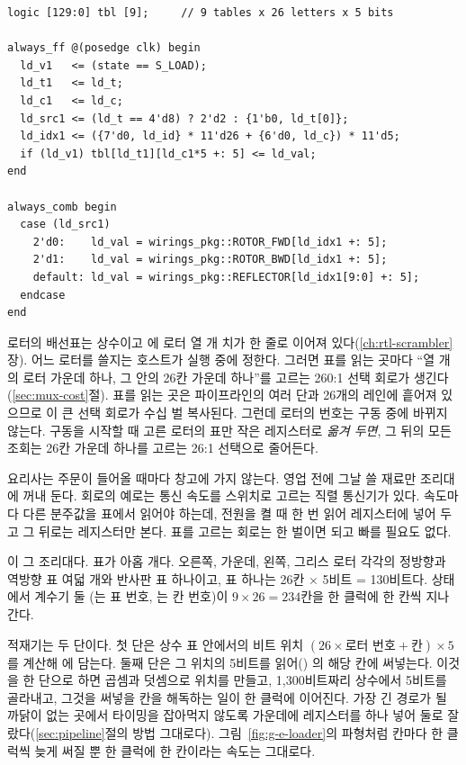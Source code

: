 \begin{lstlisting}[language=SV,caption={\code{bombe\_engine.sv}: 배선표를 한 칸씩 옮기는 두 단짜리 적재기.},label={lst:e-loader}]
logic [129:0] tbl [9];     // 9 tables x 26 letters x 5 bits

always_ff @(posedge clk) begin
  ld_v1   <= (state == S_LOAD);
  ld_t1   <= ld_t;
  ld_c1   <= ld_c;
  ld_src1 <= (ld_t == 4'd8) ? 2'd2 : {1'b0, ld_t[0]};
  ld_idx1 <= ({7'd0, ld_id} * 11'd26 + {6'd0, ld_c}) * 11'd5;
  if (ld_v1) tbl[ld_t1][ld_c1*5 +: 5] <= ld_val;
end

always_comb begin
  case (ld_src1)
    2'd0:    ld_val = wirings_pkg::ROTOR_FWD[ld_idx1 +: 5];
    2'd1:    ld_val = wirings_pkg::ROTOR_BWD[ld_idx1 +: 5];
    default: ld_val = wirings_pkg::REFLECTOR[ld_idx1[9:0] +: 5];
  endcase
end
\end{lstlisting}

\Why 로터의 배선표는 상수이고 에 로터 열 개 치가 한 줄로 이어져 있다(\ref{ch:rtl-scrambler}장).
어느 로터를 쓸지는 호스트가 실행 중에 정한다. 그러면 표를 읽는 곳마다 ``열 개의 로터 가운데 하나, 그
안의 26칸 가운데 하나''를 고르는 260:1 선택 회로가 생긴다(\ref{sec:mux-cost}절). 표를 읽는 곳은
파이프라인의 여러 단과 26개의 레인에 흩어져 있으므로 이 큰 선택 회로가 수십 벌 복사된다. 그런데 로터의
번호는 구동 중에 바뀌지 않는다. 구동을 시작할 때 고른 로터의 표만 작은 레지스터로 \emph{옮겨 두면},
그 뒤의 모든 조회는 26칸 가운데 하나를 고르는 26:1 선택으로 줄어든다.

\General 요리사는 주문이 들어올 때마다 창고에 가지 않는다. 영업 전에 그날 쓸 재료만 조리대에 꺼내 둔다.
회로의 예로는 통신 속도를 스위치로 고르는 직렬 통신기가 있다. 속도마다 다른 분주값을 표에서 읽어야 하는데,
전원을 켤 때 한 번 읽어 레지스터에 넣어 두고 그 뒤로는 레지스터만 본다. 표를 고르는 회로는 한 벌이면 되고
빠를 필요도 없다.

\Ours {}이 그 조리대다. 표가 아홉 개다. 오른쪽, 가운데, 왼쪽, 그리스 로터 각각의 정방향과 역방향
표 여덟 개와 반사판 표 하나이고, 표 하나는 26칸 $\times$ 5비트 = 130비트다.  상태에서 계수기 둘
(는 표 번호, 는 칸 번호)이 $9 \times 26 = 234$칸을 한 클럭에 한 칸씩 지나간다.

적재기는 두 단이다. 첫 단은 상수 표 안에서의 비트 위치 $(26 \times \text{로터 번호} + \text{칸}) \times 5$를
계산해 에 담는다. 둘째 단은 그 위치의 5비트를 읽어() 의 해당 칸에
써넣는다. 이것을 한 단으로 하면 곱셈과 덧셈으로 위치를 만들고, 1,300비트짜리 상수에서 5비트를 골라내고,
그것을 써넣을 칸을 해독하는 일이 한 클럭에 이어진다. 가장 긴 경로가 될 까닭이 없는 곳에서 타이밍을 잡아먹지
않도록 가운데에 레지스터를 하나 넣어 둘로 잘랐다(\ref{sec:pipeline}절의 방법 그대로다). 그림~\ref{fig:g-e-loader}의 파형처럼 칸마다 한 클럭씩
늦게 써질 뿐 한 클럭에 한 칸이라는 속도는 그대로다.


